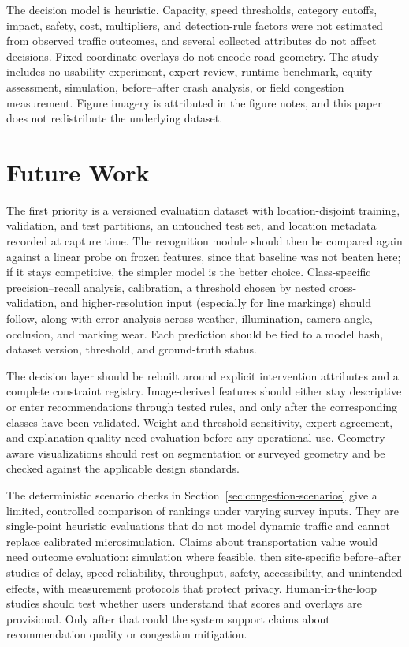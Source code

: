 \documentclass[11pt]{article}
\begin{document}
The decision model is heuristic. Capacity, speed thresholds, category cutoffs, impact, safety, cost, multipliers, and detection-rule factors were not estimated from observed traffic outcomes, and several collected attributes do not affect decisions. Fixed-coordinate overlays do not encode road geometry. The study includes no usability experiment, expert review, runtime benchmark, equity assessment, simulation, before--after crash analysis, or field congestion measurement. Figure imagery is attributed in the figure notes, and this paper does not redistribute the underlying dataset.

\section{Future Work}
The first priority is a versioned evaluation dataset with location-disjoint training, validation, and test partitions, an untouched test set, and location metadata recorded at capture time. The recognition module should then be compared again against a linear probe on frozen features, since that baseline was not beaten here; if it stays competitive, the simpler model is the better choice. Class-specific precision--recall analysis, calibration, a threshold chosen by nested cross-validation, and higher-resolution input (especially for line markings) should follow, along with error analysis across weather, illumination, camera angle, occlusion, and marking wear. Each prediction should be tied to a model hash, dataset version, threshold, and ground-truth status.

The decision layer should be rebuilt around explicit intervention attributes and a complete constraint registry. Image-derived features should either stay descriptive or enter recommendations through tested rules, and only after the corresponding classes have been validated. Weight and threshold sensitivity, expert agreement, and explanation quality need evaluation before any operational use. Geometry-aware visualizations should rest on segmentation or surveyed geometry and be checked against the applicable design standards.

The deterministic scenario checks in Section~\ref{sec:congestion-scenarios} give a limited, controlled comparison of rankings under varying survey inputs. They are single-point heuristic evaluations that do not model dynamic traffic and cannot replace calibrated microsimulation. Claims about transportation value would need outcome evaluation: simulation where feasible, then site-specific before--after studies of delay, speed reliability, throughput, safety, accessibility, and unintended effects, with measurement protocols that protect privacy. Human-in-the-loop studies should test whether users understand that scores and overlays are provisional. Only after that could the system support claims about recommendation quality or congestion mitigation.
\end{document}
